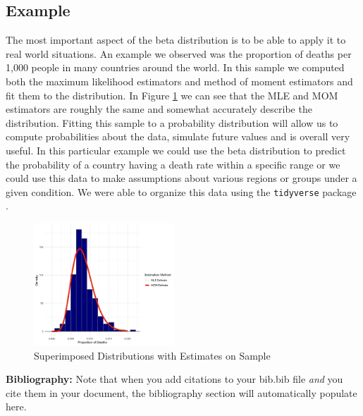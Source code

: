 \documentclass{article}\usepackage[]{graphicx}\usepackage[]{xcolor}
\begin{document}
\begin{multicols}{2}
\section{Example}

The most important aspect of the beta distribution is to be able to apply it to real world situations. An example we observed was the proportion of deaths per 1,000 people in many countries around the world. In this sample we computed both the maximum likelihood estimators and method of moment estimators and fit them to the distribution. In Figure \ref{Figure 6} we can see that the MLE and MOM estimators are roughly the same and somewhat accurately describe the distribution. Fitting this sample to a probability distribution will allow us to compute probabilities about the data, simulate future values and is overall very useful. In this particular example we could use the beta distribution to predict the probability of a country having a death rate within a specific range or we could use this data to make assumptions about various regions or groups under a given condition. We were able to organize this data using the \texttt{tidyverse} package \citep{tidyverse}.

\begin{figure}[H]
\centering
\includegraphics[width=0.47\textwidth]{EstiSamp}  %
\caption{Superimposed Distributions with Estimates on Sample}
\label{Figure 6}
\end{figure}





\vspace{2em}

\noindent\textbf{Bibliography:} Note that when you add citations to your bib.bib file \emph{and}
you cite them in your document, the bibliography section will automatically populate here.

\begin{tiny}

\end{tiny}
\end{multicols}
\end{document}
